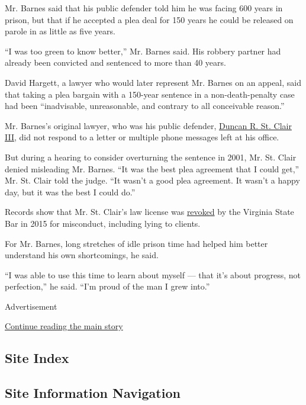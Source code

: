 Mr. Barnes said that his public defender told him he was facing 600
years in prison, but that if he accepted a plea deal for 150 years he
could be released on parole in as little as five years.

``I was too green to know better,'' Mr. Barnes said. His robbery partner
had already been convicted and sentenced to more than 40 years.

David Hargett, a lawyer who would later represent Mr. Barnes on an
appeal, said that taking a plea bargain with a 150-year sentence in a
non-death-penalty case had been ``inadvisable, unreasonable, and
contrary to all conceivable reason.''

Mr. Barnes's original lawyer, who was his public defender,
\href{https://www.manta.com/d/mm8c7w9/duncan-r-st-clair-iii-associates-p-c}{Duncan
R. St. Clair III}, did not respond to a letter or multiple phone
messages left at his office.

But during a hearing to consider overturning the sentence in 2001, Mr.
St. Clair denied misleading Mr. Barnes. ``It was the best plea agreement
that I could get,'' Mr. St. Clair told the judge. ``It wasn't a good
plea agreement. It wasn't a happy day, but it was the best I could do.''

Records show that Mr. St. Clair's law license was
\href{https://www.vsb.org/docs/StClair-041715.pdf}{revoked} by the
Virginia State Bar in 2015 for misconduct, including lying to clients.

For Mr. Barnes, long stretches of idle prison time had helped him better
understand his own shortcomings, he said.

``I was able to use this time to learn about myself --- that it's about
progress, not perfection,'' he said. ``I'm proud of the man I grew
into.''

Advertisement

\protect\hyperlink{after-bottom}{Continue reading the main story}

\hypertarget{site-index}{%
\subsection{Site Index}\label{site-index}}

\hypertarget{site-information-navigation}{%
\subsection{Site Information
Navigation}\label{site-information-navigation}}

